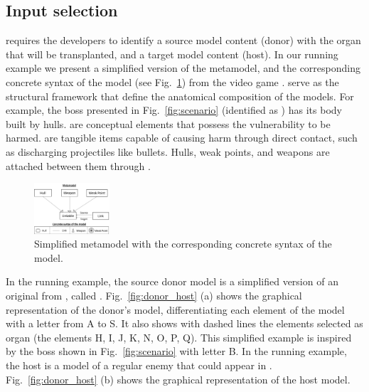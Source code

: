 \subsection{Input selection}

\ApproachName{} requires the developers to identify a source model content (donor) with the organ that will be transplanted, and a target model content (host). %
In our running example we present a simplified version of the metamodel, and the corresponding concrete syntax of the model (see Fig.~\ref{fig:metamodel+syntax}) from the video game \CaseStudy{}. 
 serve as the structural framework that define the anatomical composition of the models. For example, the boss presented in Fig.~\ref{fig:scenario} (identified as ) has its body built by hulls.
 are conceptual elements that possess the vulnerability to be harmed.
 are tangible items capable of causing harm through direct contact, such as discharging projectiles like bullets.
Hulls, weak points, and weapons are attached between them through .

\begin{figure}[tb]
    \centering
    \includegraphics[width=0.25\textwidth]{Figures/metamodel+syntax.png}
    \caption{Simplified metamodel with the corresponding concrete syntax of the model.}
    \label{fig:metamodel+syntax}
\end{figure}

In the running example, the source donor model is a simplified version of an original  from \CaseStudy{}, called . Fig.~\ref{fig:donor_host} (a) shows the graphical representation of the donor's model, differentiating each element of the model with a letter from A to S. It also shows with dashed lines the elements selected as organ (the elements H, I, J, K, N, O, P, Q).
This simplified example is inspired by the boss shown in Fig.~\ref{fig:scenario} with letter B. In the running example, the host is a model of a regular enemy that could appear in \CaseStudy{}. Fig.~\ref{fig:donor_host} (b) shows the graphical representation of the host model.

